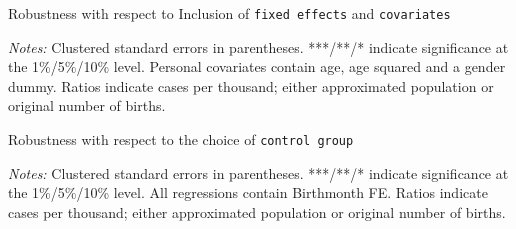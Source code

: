 \documentclass{scrartcl} %
\begin{document}
\begin{table}[H] %
\begin{threeparttable}
\centering %
\caption{Robustness with respect to Inclusion of \texttt{fixed effects} and \texttt{covariates}} %
\label{table 1} %

\begin{tablenotes}
    \item \scriptsize 
\emph{Notes:} Clustered standard errors in parentheses. ***/**/* indicate significance at the 1\%/5\%/10\% level. Personal covariates contain age, age squared and a gender dummy. Ratios indicate cases per thousand; either approximated population or original number of births.
    \end{tablenotes}
  \end{threeparttable}
\end{table}
\begin{table}[H] %
\begin{threeparttable}
\centering %
\caption{Robustness with respect to the choice of \texttt{control group}} %
\label{table 1} %

\begin{tablenotes}
    \item \scriptsize 
\emph{Notes:} Clustered standard errors in parentheses. ***/**/* indicate significance at the 1\%/5\%/10\% level. All regressions contain Birthmonth FE. Ratios indicate cases per thousand; either approximated population or original number of births.
    \end{tablenotes}
  \end{threeparttable}
\end{table}
\end{document}
